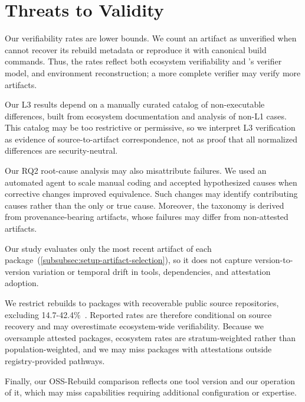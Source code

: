\section{Threats to Validity}

Our verifiability rates are lower bounds. We count an artifact as unverified when \toolname cannot recover its rebuild metadata or reproduce it with canonical build commands. Thus, the rates reflect both ecosystem verifiability and \toolname's verifier model, and environment reconstruction; a more complete verifier may verify more artifacts.

Our L3 results depend on a manually curated catalog of non-executable differences, built from ecosystem documentation and analysis of non-L1 cases. This catalog may be too restrictive or permissive, so we interpret L3 verification as evidence of source-to-artifact correspondence, not as proof that all normalized differences are security-neutral.

Our RQ2 root-cause analysis may also misattribute failures. We used an automated agent to scale manual coding and accepted hypothesized causes when corrective changes improved equivalence. Such changes may identify contributing causes rather than the only or true cause. Moreover, the taxonomy is derived from provenance-bearing artifacts, whose failures may differ from non-attested artifacts.

Our study evaluates only the most recent artifact of each package~(\cref{subsubsec:setup-artifact-selection}), so it does not capture version-to-version variation or temporal drift in tools, dependencies, and attestation adoption.

We restrict rebuilds to packages with recoverable public source repositories, excluding 14.7-42.4\%~\cite{PypiNpmGHAccessibility, tsakpinis2026investigatingnotablemetadatapractices}. Reported rates are therefore conditional on source recovery and may overestimate ecosystem-wide verifiability. Because we oversample attested packages, ecosystem rates are stratum-weighted rather than population-weighted, and we may miss packages with attestations outside registry-provided pathways.

Finally, our OSS-Rebuild comparison reflects one tool version and our operation of it, which may miss capabilities requiring additional configuration or expertise.




